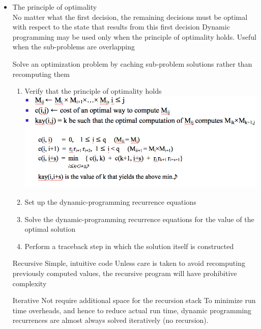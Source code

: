 \documentclass[a4paper,12pt,twoside]{book}
\begin{document}
\begin{itemize}
\item The principle of optimality \\
No matter what the first decision, the remaining decisions must be optimal with respect to the state that results from this first decision
Dynamic programming may be used only when the principle of optimality holds. Useful when the sub-problems are overlapping

Solve an optimization problem by caching  sub-problem solutions rather than recomputing them

\begin{enumerate}
\item Verify that the principle of optimality holds  \newline
\includegraphics[scale=0.45]{pics/Recurrence.png} \newline

\item Set up the dynamic-programming recurrence equations
\item Solve the dynamic-programming recurrence equations for the value of the optimal solution
\item Perform a traceback step in which the solution itself is constructed
\end{enumerate}


Recursive
Simple, intuitive code
Unless care is taken to avoid recomputing previously computed values, the recursive program will have prohibitive complexity

Iterative
Not require additional space for the recursion stack
To minimize run time overheads, and hence to reduce actual run time, dynamic programming recurrences are almost always solved iteratively    (no recursion).

\end{itemize}
\end{document}
